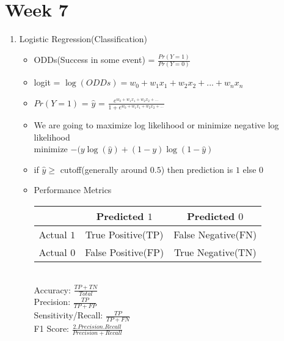 \documentclass[a4paper]{article}
\begin{document}
 \section{Week 7}
 \begin{enumerate}
     \item Logistic Regression(Classification)
     \begin{itemize}
         \item ODDs(Success in some event) = $\frac{Pr(Y=1)}{Pr(Y=0)}$
         \item logit = $\log(ODDs) = w_0 + w_1x_1 + w_2x_2 + ... + w_nx_n$
         \item $Pr(Y=1)$ = $\hat{y}$ = $\frac{e^{w_0 + w_1x_1 + w_2x_2 + ...}}{1 + e^{w_0 + w_1x_1 + w_2x_2 + ...}}$
         \item We are going to maximize log likelihood or minimize negative log likelihood\\
         minimize $-(y\log(\hat{y}) + (1-y)\log(1-\hat{y})$
         \item if $\hat{y}\geq $ cutoff(generally around $0.5$) then prediction is $1$ else $0$
         \item Performance Metrics\\
         \begin{tabular}{|c||c|c|}
			\hline
			& Predicted $1$& Predicted $0$\\
			\hline \hline
			Actual $1$& True Positive(TP)& False Negative(FN)\\
			\hline
			Actual $0$& False Positive(FP)& True Negative(TN)\\
			\hline
		\end{tabular}\\
        Accuracy: $\frac{TP + TN}{Total}$\\
        Precision: $\frac{TP}{TP+FP}$\\
        Sensitivity/Recall: $\frac{TP}{TP+FN}$\\
        F1 Score: $\frac{2.Precision.Recall}{Precision+Recall}$
     \end{itemize}
 \end{enumerate}
\end{document}
